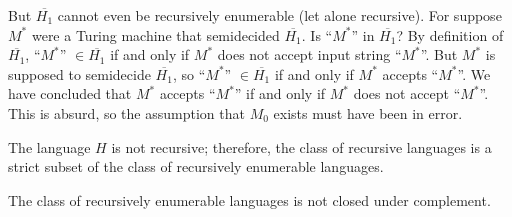 But $\overline{H_1}$ cannot even be recursively enumerable (let alone recursive). For suppose $M^*$ were a Turing machine that semidecided $\overline{H_1}$. Is ``$M^*$'' in $\overline{H_1}$? By definition of $\overline{H_1}$, ``$M^*$'' $\in \overline{H_1}$ if and only if $M^*$ does not accept input string ``$M^*$''. But $M^*$ is supposed to semidecide $\overline{H_1}$, so ``$M^*$'' $\in \overline{H_1}$ if and only if $M^*$
accepts ``$M^*$''. We have concluded that $M^*$ accepts ``$M^*$'' if and only if $M^*$ does not accept ``$M^*$''. This is absurd, so the assumption that $M_0$ exists must have been in error.

\begin{theorem}{}
  The language $H$ is not recursive; therefore, the class of recursive languages is a strict subset of the class of recursively enumerable languages.
\end{theorem}

\begin{theorem}{}
  The class of recursively enumerable languages is not closed under complement.
\end{theorem}